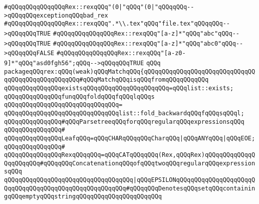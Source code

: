 \verb|#qQQqqQQqqQQqqQQqRex::rexqQQq"(0|\verb#|"qQQq"(0|"qQQqqQQq-->qQQqqQQqexceptionqQQqbad_rex#\newline
\verb|#qQQqqQQqqQQqqQQqRex::rexqQQq".*\\.tex"qQQq"file.tex"qQQqqQQq-->qQQqqQQqTRUE|\newline
\verb|#qQQqqQQqqQQqqQQqRex::rexqQQq"[a-z]*"qQQq"abc"qQQq-->qQQqqQQqTRUE|\newline
\verb|#qQQqqQQqqQQqqQQqRex::rexqQQq"[a-z]*"qQQq"abc0"qQQq-->qQQqqQQqFALSE|\newline
\verb|#qQQqqQQqqQQqqQQqRex::rexqQQq"[a-z0-9]*"qQQq"asd0fgh56";qQQq-->qQQqqQQqTRUE|\newline
\newline
\verb|qQQq|\newline
\newline
\verb|packageqQQqrex:qQQq(weak)qQQqMatchqQQq{qQQqqQQqqQQqqQQqqQQqqQQqqQQqqQQqqQQqqQQqqQQqqQQqqQQq#qQQqMatchqQQqisqQQqfromqQQqqQQqqQQq|\newline
\newline
\verb|qQQqqQQqqQQqqQQqexistsqQQqqQQqqQQqqQQqqQQqqQQq=qQQqlist::exists;|\newline
\newline
\verb|qQQqqQQqqQQqqQQqfunqQQqfoldqQQqfqQQqlqQQqs|\newline
\verb|qQQqqQQqqQQqqQQqqQQqqQQqqQQqqQQq=|\newline
\verb|qQQqqQQqqQQqqQQqqQQqqQQqqQQqqQQqlist::fold_backwardqQQqfqQQqsqQQql;|\newline
\newline
\newline
\verb|qQQqqQQqqQQqqQQq#qQQqParsetreeqQQqforqQQqregularqQQqexpressionsqQQq|\newline
\verb|qQQqqQQqqQQqqQQq#|\newline
\verb|qQQqqQQqqQQqqQQqLeafqQQq=qQQqCHARqQQqqQQqCharqQQq|\verb#|qQQqANYqQQq|qQQqEOE;#\newline
\verb|qQQqqQQqqQQqqQQq#|\newline
\verb|qQQqqQQqqQQqqQQqRexqQQqqQQq=qQQqCATqQQqqQQq(Rex,qQQqRex)qQQqqQQqqQQqqQQqqQQqqQQq#qQQqqQQqConcatenationqQQqofqQQqtwoqQQqregularqQQqexpressionsqQQq|\newline
\verb|qQQqqQQqqQQqqQQqqQQqqQQqqQQqqQQqqQQq|\verb#|qQQqEPSILONqQQqqQQqqQQqqQQqqQQqqQQqqQQqqQQqqQQqqQQqqQQqqQQqqQQqqQQq#\verb|#qQQqqQQqDenotesqQQqsetqQQqcontainingqQQqemptyqQQqstringqQQqqQQqqQQqqQQqqQQqqQQq|\newline
